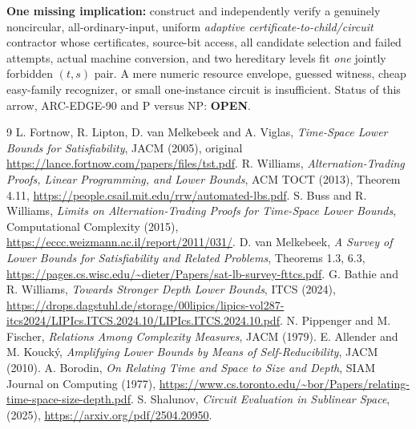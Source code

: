 \documentclass[11pt]{article}
\begin{document}
\textbf{One missing implication:} construct and independently verify
a genuinely noncircular, all-ordinary-input, uniform \emph{adaptive
certificate-to-child/circuit} contractor whose certificates,
source-bit access, all candidate selection and failed attempts,
actual machine conversion, and two hereditary levels fit
\emph{one} jointly forbidden $(t,s)$ pair. A mere
numeric resource envelope, guessed witness, cheap easy-family
recognizer, or small one-instance circuit is insufficient.
Status of this arrow, ARC-EDGE-90 and P versus NP: \textbf{OPEN}.

\begin{thebibliography}{9}
 L. Fortnow, R. Lipton, D. van Melkebeek and A. Viglas,
\emph{Time-Space Lower Bounds for Satisfiability}, JACM (2005),
original \url{https://lance.fortnow.com/papers/files/tst.pdf}.
 R. Williams,
\emph{Alternation-Trading Proofs, Linear Programming, and Lower Bounds},
ACM TOCT (2013), Theorem 4.11,
\url{https://people.csail.mit.edu/rrw/automated-lbs.pdf}.
 S. Buss and R. Williams,
\emph{Limits on Alternation-Trading Proofs for Time-Space Lower Bounds},
Computational Complexity (2015),
\url{https://eccc.weizmann.ac.il/report/2011/031/}.
 D. van Melkebeek,
\emph{A Survey of Lower Bounds for Satisfiability and Related Problems},
Theorems 1.3, 6.3,
\url{https://pages.cs.wisc.edu/~dieter/Papers/sat-lb-survey-fttcs.pdf}.
 G. Bathie and R. Williams,
\emph{Towards Stronger Depth Lower Bounds}, ITCS (2024),
\url{https://drops.dagstuhl.de/storage/00lipics/lipics-vol287-itcs2024/LIPIcs.ITCS.2024.10/LIPIcs.ITCS.2024.10.pdf}.
 N. Pippenger and M. Fischer,
\emph{Relations Among Complexity Measures},
JACM (1979).
 E. Allender and M. Kouck\'y,
\emph{Amplifying Lower Bounds by Means of Self-Reducibility},
JACM (2010).
 A. Borodin,
\emph{On Relating Time and Space to Size and Depth},
SIAM Journal on Computing (1977),
\url{https://www.cs.toronto.edu/~bor/Papers/relating-time-space-size-depth.pdf}.
 S. Shalunov,
\emph{Circuit Evaluation in Sublinear Space}, (2025),
\url{https://arxiv.org/pdf/2504.20950}.
\end{thebibliography}
\end{document}
